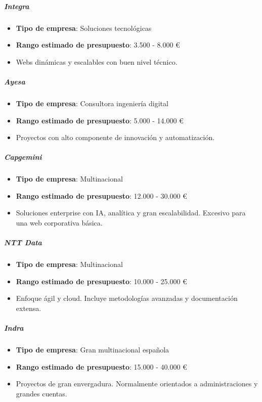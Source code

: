 \documentclass[11.5pt]{article}
\begin{document}
	\subparagraph*{Integra}
	
	\begin{itemize}
		\item \textbf{Tipo de empresa}: Soluciones tecnológicas
		\item \textbf{Rango estimado de presupuesto}: 3.500 - 8.000 €
		\item Webs dinámicas y escalables con buen nivel técnico.
	\end{itemize}
	
	\subparagraph*{Ayesa}
	
	\begin{itemize}
		\item \textbf{Tipo de empresa}: Consultora ingeniería digital
		\item \textbf{Rango estimado de presupuesto}: 5.000 - 14.000 €
		\item Proyectos con alto componente de innovación y automatización.
	\end{itemize}
	
	\subparagraph*{Capgemini}
	
	\begin{itemize}
		\item \textbf{Tipo de empresa}: Multinacional
		\item \textbf{Rango estimado de presupuesto}: 12.000 - 30.000 €
		\item Soluciones enterprise con IA, analítica y gran escalabilidad. Excesivo para una web corporativa básica.
	\end{itemize}
	
	\subparagraph*{NTT Data}
	
	\begin{itemize}
		\item \textbf{Tipo de empresa}: Multinacional
		\item \textbf{Rango estimado de presupuesto}: 10.000 - 25.000 €
		\item Enfoque ágil y cloud. Incluye metodologías avanzadas y documentación extensa.
	\end{itemize}
	
	\subparagraph*{Indra}
	
	\begin{itemize}
		\item \textbf{Tipo de empresa}: Gran multinacional española
		\item \textbf{Rango estimado de presupuesto}: 15.000 - 40.000 €
		\item Proyectos de gran envergadura. Normalmente orientados a administraciones y grandes cuentas.
	\end{itemize}
	
\end{document}
